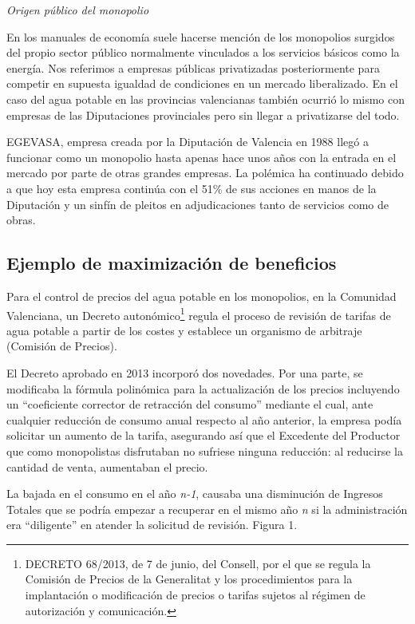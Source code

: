 \documentclass[
]{article}
\begin{document}
\emph{Origen público del monopolio}

En los manuales de economía suele hacerse mención de los monopolios
surgidos del propio sector público normalmente vinculados a los
servicios básicos como la energía. Nos referimos a empresas públicas
privatizadas posteriormente para competir en supuesta igualdad de
condiciones en un mercado liberalizado. En el caso del agua potable en
las provincias valencianas también ocurrió lo mismo con empresas de las
Diputaciones provinciales pero sin llegar a privatizarse del todo.

EGEVASA, empresa creada por la Diputación de Valencia en 1988 llegó a
funcionar como un monopolio hasta apenas hace unos años con la entrada
en el mercado por parte de otras grandes empresas. La polémica ha
continuado debido a que hoy esta empresa continúa con el 51\% de sus
acciones en manos de la Diputación y un sinfín de pleitos en
adjudicaciones tanto de servicios como de obras.

\hypertarget{ejemplo-de-maximizaciuxf3n-de-beneficios}{%
\subsection*{Ejemplo de maximización de
beneficios}\label{ejemplo-de-maximizaciuxf3n-de-beneficios}}

Para el control de precios del agua potable en los monopolios, en la
Comunidad Valenciana, un Decreto autonómico\footnote{DECRETO 68/2013, de
  7 de junio, del Consell, por el que se regula la Comisión de Precios
  de la Generalitat y los procedimientos para la implantación o
  modificación de precios o tarifas sujetos al régimen de autorización y
  comunicación.} regula el proceso de revisión de tarifas de agua
potable a partir de los costes y establece un organismo de arbitraje
(Comisión de Precios).

El Decreto aprobado en 2013 incorporó dos novedades. Por una parte, se
modificaba la fórmula polinómica para la actualización de los precios
incluyendo un ``coeficiente corrector de retracción del consumo''
mediante el cual, ante cualquier reducción de consumo anual respecto al
año anterior, la empresa podía solicitar un aumento de la tarifa,
asegurando así que el Excedente del Productor que como monopolistas
disfrutaban no sufriese ninguna reducción: al reducirse la cantidad de
venta, aumentaban el precio.

La bajada en el consumo en el año \emph{n-1}, causaba una disminución de
Ingresos Totales que se podría empezar a recuperar en el mismo año
\emph{n} si la administración era ``diligente'' en atender la solicitud
de revisión. Figura 1.
\end{document}
